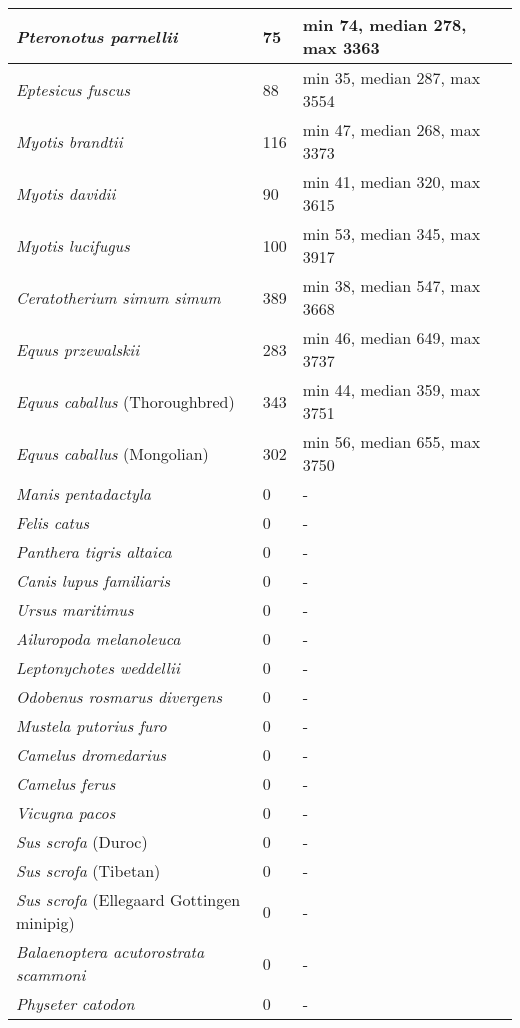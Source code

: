 {\begin{longtable}{| L{4cm} | L{2cm}  | L{5cm} | L{4cm} |}
\textit{Pteronotus parnellii} & 75 & min 74, median 278, max 3363 & \\ \hline
\textit{Eptesicus fuscus} & 88 & min 35, median 287, max 3554 & \\ \hline
\textit{Myotis brandtii} & 116 & min 47, median 268, max 3373 & \\ \hline
\textit{Myotis davidii} & 90 & min 41, median 320, max 3615 & \\ \hline
\textit{Myotis lucifugus} & 100 & min 53, median 345, max 3917 & \\ \hline
\textit{Ceratotherium simum simum} & 389 & min 38, median 547, max 3668 & \\ \hline
\textit{Equus przewalskii} & 283 & min 46, median 649, max 3737 & \\ \hline
\textit{Equus caballus} (Thoroughbred) & 343 & min 44, median 359, max 3751 & \\ \hline
\textit{Equus caballus} (Mongolian) & 302 & min 56, median 655, max 3750 & \\ \hline
\textit{Manis pentadactyla} & 0 & - & \\ \hline
\textit{Felis catus} & 0 & - & \\ \hline
\textit{Panthera tigris altaica} & 0 & - & \\ \hline
\textit{Canis lupus familiaris} & 0 & - & \\ \hline
\textit{Ursus maritimus} & 0 & - & \\ \hline
\textit{Ailuropoda melanoleuca} & 0 & - & \\ \hline
\textit{Leptonychotes weddellii} & 0 & - & \\ \hline
\textit{Odobenus rosmarus divergens} & 0 & - & \\ \hline
\textit{Mustela putorius furo} & 0 & - & \\ \hline
\textit{Camelus dromedarius} & 0 & - & \\ \hline
\textit{Camelus ferus} & 0 & - & \\ \hline
\textit{Vicugna pacos} & 0 & - & \\ \hline
\textit{Sus scrofa} (Duroc) & 0 & - & \\ \hline
\textit{Sus scrofa} (Tibetan) & 0 & - & \\ \hline
\textit{Sus scrofa} (Ellegaard Gottingen minipig) & 0 & - & \\ \hline
\textit{Balaenoptera acutorostrata scammoni} & 0 & - & \\ \hline
\textit{Physeter catodon} & 0 & - & \\ \hline

\end{longtable}}
